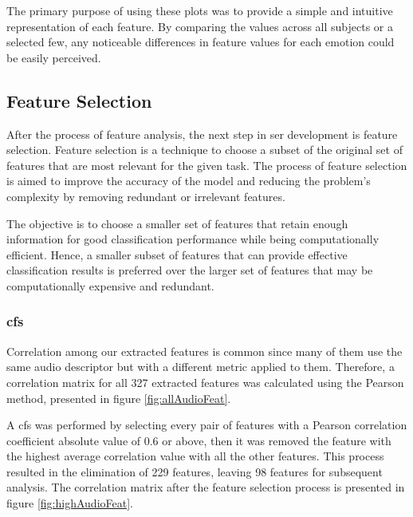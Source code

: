 The primary purpose of using these plots was to provide a simple and intuitive representation of each feature. By comparing the values across all subjects or a selected few, any noticeable differences in feature values for each emotion could be easily perceived.

\subsection{Feature Selection}

After the process of feature analysis, the next step in \ac{ser} development is feature selection. Feature selection is a technique to choose a subset of the original set of features that are most relevant for the given task. The process of feature selection is aimed to improve the accuracy of the model and reducing the problem's complexity by removing redundant or irrelevant features. 

The objective is to choose a smaller set of features that retain enough information for good classification performance while being computationally efficient. Hence, a smaller subset of features that can provide effective classification results is preferred over the larger set of features that may be computationally expensive and redundant.

\subsubsection{\acl{cfs}}

Correlation among our extracted features is common since many of them use the same audio descriptor but with a different metric applied to them. Therefore, a correlation matrix for all 327 extracted features was calculated using the Pearson method, presented in figure \ref{fig:allAudioFeat}.

A \ac{cfs} was performed by selecting every pair of features with a Pearson correlation coefficient absolute value of 0.6 or above, then it was removed the feature with the highest average correlation value with all the other features. This process resulted in the elimination of 229 features, leaving 98 features for subsequent analysis. The correlation matrix after the feature selection process is presented in figure \ref{fig:highAudioFeat}.

